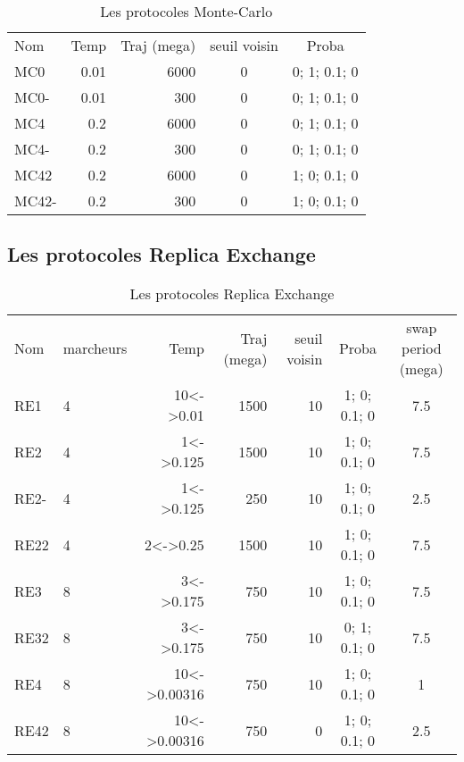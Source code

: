     \begin{table}
      \begin{tabular}{lrrcc}

        \toprule
        Nom & Temp & Traj (mega)& seuil voisin  & Proba \\
        \cmidrule{1-5}
        MC0   & 0.01  &  6000 & 0 & 0; 1; 0.1; 0   \\  
        MC0-  & 0.01  &   300 & 0 & 0; 1; 0.1; 0   \\  
        MC4   & 0.2   &  6000 & 0 & 0; 1; 0.1; 0   \\          
        MC4-  & 0.2   &   300 & 0 & 0; 1; 0.1; 0   \\ 
        MC42  & 0.2   &  6000 & 0 & 1; 0; 0.1; 0   \\        
        MC42- & 0.2   &   300 & 0 & 1; 0; 0.1; 0   \\   
        \bottomrule                   

       
      \end{tabular}      
      \caption{Les protocoles Monte-Carlo}
\label{tab:protoMC2}      

     \end{table}


   \subsection{Les protocoles Replica Exchange} 
    
    \begin{table}[!htbp]
      \centering

      \begin{tabular}{llrrrcc}

        \toprule
        Nom & marcheurs &Temp & Traj (mega)& seuil voisin  & Proba & swap period (mega)\\
        \cmidrule{1-7}
        RE1   & 4 & 10<->0.01    &  1500 & 10 & 1; 0; 0.1; 0 &  7.5\\  
        RE2   & 4 & 1<->0.125    &  1500 & 10 & 1; 0; 0.1; 0 &  7.5\\  
        RE2-  & 4 & 1<->0.125    &  250  & 10 & 1; 0; 0.1; 0 &  2.5\\  
        RE22  & 4 & 2<->0.25     &  1500 & 10 & 1; 0; 0.1; 0 &  7.5\\  
        RE3   & 8 & 3<->0.175    &  750  & 10 & 1; 0; 0.1; 0 &  7.5\\
        RE32  & 8 & 3<->0.175    &  750  & 10 & 0; 1; 0.1; 0 &  7.5\\
        RE4   & 8 & 10<->0.00316 &  750  & 10 & 1; 0; 0.1; 0 &  1\\  
        RE42  & 8 & 10<->0.00316 &  750  &  0 & 1; 0; 0.1; 0 &  2.5\\  
        \bottomrule

      \end{tabular}      
      \caption{Les protocoles Replica Exchange}
\label{tab:protoRE}      
    \end{table}


